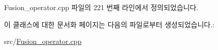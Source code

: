 Fusion\+\_\+operator.\+cpp 파일의 221 번째 라인에서 정의되었습니다.



이 클래스에 대한 문서화 페이지는 다음의 파일로부터 생성되었습니다.\+:\begin{DoxyCompactItemize}
\item 
src/\hyperlink{Fusion__operator_8cpp}{Fusion\+\_\+operator.\+cpp}\end{DoxyCompactItemize}
